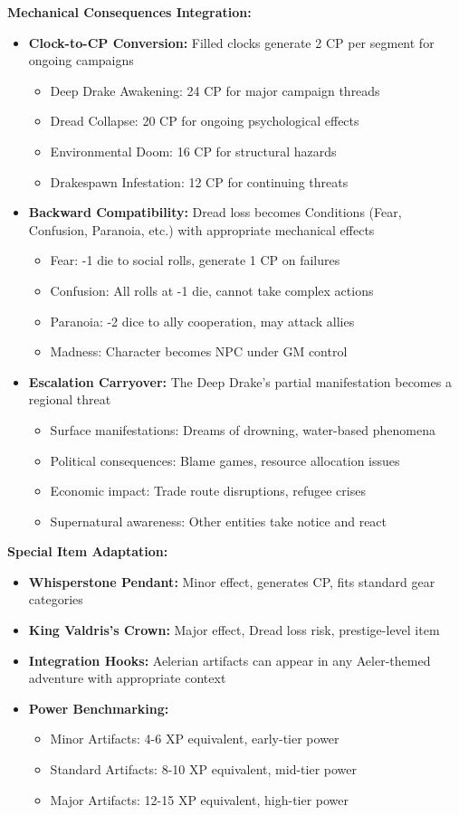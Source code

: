 \documentclass[11pt]{article}
\begin{document}
\textbf{Mechanical Consequences Integration:}
\begin{itemize}
\item \textbf{Clock-to-CP Conversion:} Filled clocks generate 2 CP per segment for ongoing campaigns
  \begin{itemize}
  \item Deep Drake Awakening: 24 CP for major campaign threads
  \item Dread Collapse: 20 CP for ongoing psychological effects
  \item Environmental Doom: 16 CP for structural hazards
  \item Drakespawn Infestation: 12 CP for continuing threats
  \end{itemize}
\item \textbf{Backward Compatibility:} Dread loss becomes Conditions (Fear, Confusion, Paranoia, etc.) with appropriate mechanical effects
  \begin{itemize}
  \item Fear: -1 die to social rolls, generate 1 CP on failures
  \item Confusion: All rolls at -1 die, cannot take complex actions
  \item Paranoia: -2 dice to ally cooperation, may attack allies
  \item Madness: Character becomes NPC under GM control
  \end{itemize}
\item \textbf{Escalation Carryover:} The Deep Drake's partial manifestation becomes a regional threat
  \begin{itemize}
  \item Surface manifestations: Dreams of drowning, water-based phenomena
  \item Political consequences: Blame games, resource allocation issues
  \item Economic impact: Trade route disruptions, refugee crises
  \item Supernatural awareness: Other entities take notice and react
  \end{itemize}
\end{itemize}

\textbf{Special Item Adaptation:}
\begin{itemize}
\item \textbf{Whisperstone Pendant:} Minor effect, generates CP, fits standard gear categories
\item \textbf{King Valdris's Crown:} Major effect, Dread loss risk, prestige-level item
\item \textbf{Integration Hooks:} Aelerian artifacts can appear in any Aeler-themed adventure with appropriate context
\item \textbf{Power Benchmarking:}
  \begin{itemize}
  \item Minor Artifacts: 4-6 XP equivalent, early-tier power
  \item Standard Artifacts: 8-10 XP equivalent, mid-tier power
  \item Major Artifacts: 12-15 XP equivalent, high-tier power
  \end{itemize}
\end{itemize}
\end{document}
